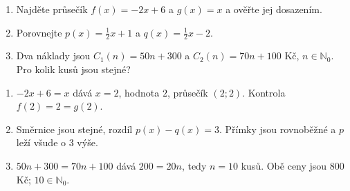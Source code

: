 \documentclass[11pt,a4paper]{article}
\begin{document}
\begin{zadaniReseniBox}[title={Domácí úkol}]
\begin{enumerate}[label=\alph*)]
\item Najděte průsečík $f(x)=-2x+6$ a $g(x)=x$ a ověřte jej dosazením.
\item Porovnejte $p(x)=\frac12x+1$ a $q(x)=\frac12x-2$.
\item Dva náklady jsou $C_1(n)=50n+300$ a $C_2(n)=70n+100$ Kč, $n\in\mathbb N_0$. Pro kolik kusů jsou stejné?
\end{enumerate}
\tcblower
\begin{enumerate}[label=\alph*)]
\item $-2x+6=x$ dává $x=2$, hodnota $2$, průsečík $(2;2)$. Kontrola $f(2)=2=g(2)$.
\item Směrnice jsou stejné, rozdíl $p(x)-q(x)=3$. Přímky jsou rovnoběžné a $p$ leží všude o $3$ výše.
\item $50n+300=70n+100$ dává $200=20n$, tedy $n=10$ kusů. Obě ceny jsou $800$ Kč; $10\in\mathbb N_0$.
\end{enumerate}
\end{zadaniReseniBox}
\end{document}

